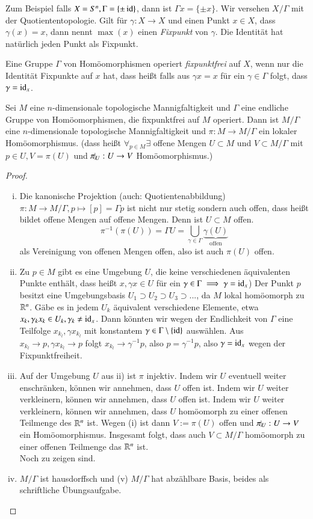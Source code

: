 \documentclass[a4paper,10pt]{scrartcl}
\begin{document}
Zum Beispiel falls $X=S^n, \Gamma=\{\pm \operatorname{id}\}$, dann ist $\Gamma x=\{\pm x\}$. Wir versehen $X/\Gamma$ mit der Quotiententopologie. Gilt für $\gamma:X\to X$ und einen Punkt $x\in X$, dass $\gamma(x)=x$, dann nennt $\max(x)$ einen \emph{Fixpunkt} von $\gamma$. Die Identität hat natürlich jeden Punkt als Fixpunkt.
\begin{df}
 Eine Gruppe $\Gamma$ von Homöomorphismen operiert \emph{fixpunktfrei} auf $X$, wenn nur die Identität Fixpunkte auf $x$ hat, dass heißt falls aus $\gamma x=x$ für ein $\gamma\in \Gamma$ folgt, dass $\gamma=\operatorname{id}_x$.
\end{df}
\begin{st}
 Sei $M$ eine $n$-dimensionale topologische Mannigfaltigkeit und $\Gamma$ eine endliche Gruppe von Homöomorphismen, 
die fixpunktfrei auf $M$ operiert. Dann ist $M/\Gamma$ eine $n$-dimensionale topologische Mannigfaltigkeit 
und $\pi:M\to M/\Gamma$ ein lokaler Homöomorphismus. (dass heißt $\forall_{p\in M} \exists$ offene Mengen $U\subset M$ und $V\subset M/\Gamma$ mit $p\in U, V=\pi(U)$ und $\pi\vline_U: U\to V$ Homöomorphismus.)
\end{st}
\begin{proof}
 \begin{enumerate}[(i)]
  \item Die kanonische Projektion (auch: Quotientenabbildung) $\pi:M\to M/\Gamma, p\mapsto [p]=\Gamma p$ ist nicht nur stetig sondern auch offen, dass heißt bildet offene Mengen auf offene Mengen. Denn ist $U\subset M$ offen. 
\[
 \pi^{-1}(\pi(U))=\Gamma U=\bigcup\limits_{\gamma\in \Gamma} \underbrace{\gamma(U)}_{\text{offen}}
\]
als Vereinigung von offenen Mengen offen, also ist auch $\pi(U)$ offen.
\item Zu $p\in M$ gibt es eine Umgebung $U$, die keine verschiedenen äquivalenten Punkte enthält, dass heißt $x,\gamma x\in U$ für ein $\gamma\in \Gamma \implies \gamma=\operatorname{id}_x$)
Der Punkt $p$ besitzt eine Umgebungsbasis $U_1\supset U_2 \supset U_3 \supset...$, da $M$ lokal homöomorph zu $\mathbb{R}^n$. Gäbe es in jedem $U_k$ äquivalent verschiedene Elemente, etwa $x_k, \gamma_k x_k\in U_k, \gamma_k\neq \operatorname{id}_x$.
Dann könnten wir wegen der Endlichkeit von $\Gamma$ eine Teilfolge $x_{k_l}, \gamma x_{k_l}$ mit konstantem $\gamma\in \Gamma\setminus\{\operatorname{id}\}$ auswählen. Aus $x_{k_l}\to p, \gamma x_{k_l}\to p$ folgt $x_{k_l} \to \gamma^{-1} p$, also $p=\gamma^{-1} p$, also $\gamma=\operatorname{id}_x$ wegen der Fixpunktfreiheit.
\item Auf der Umgebung $U$ aus ii) ist $\pi$ injektiv. Indem wir $U$ eventuell weiter enschränken, können wir annehmen, dass $U$ offen ist. Indem wir $U$ weiter verkleinern, können wir annehmen, dass $U$ offen ist. Indem wir $U$ weiter verkleinern, können wir annehmen, dass $U$ homöomorph zu einer offenen Teilmenge des $\mathbb{R}^n$ ist. Wegen (i) ist dann $V:=\pi(U)$ offen und $\pi\vline_U:U\to V$ ein Homöomorphismus.  Insgesamt folgt, dass auch $V\subset M/\Gamma$ homöomorph zu einer offenen Teilmenge das $\mathbb{R}^n$ ist. \\
Noch zu zeigen sind.
\item $M/\Gamma$ ist hausdorffsch und (v) $M/\Gamma$ hat abzählbare Basis, beides als schriftliche Übungsaufgabe.  
\end{enumerate}
\end{proof}
\end{document}

